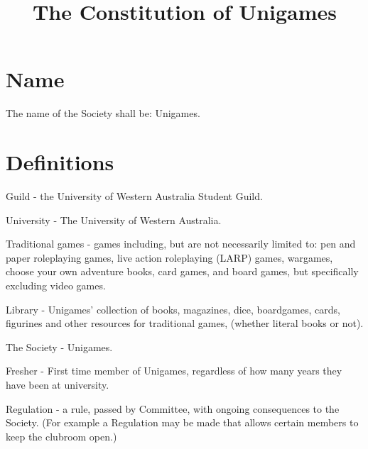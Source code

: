 \documentclass[a4paper]{article}
\title{The Constitution of Unigames}
\author{}
\date{}
\begin{document}
\maketitle


\section{Name} \label{sec:name}
\begin{myEnumerate}
    \item The name of the Society shall be: Unigames.
\end{myEnumerate}


\section{Definitions} \label{sec:definitions}
\begin{myEnumerate}
    \item Guild - the University of Western Australia Student Guild.
    \item University - The University of Western Australia.
    \item Traditional games - games including, but are not necessarily limited to: pen and paper roleplaying games, live action roleplaying (LARP) games, wargames, choose your own adventure books, card games, and board games, but specifically excluding video games.
    \item Library - Unigames' collection of books, magazines, dice, boardgames, cards, figurines and other resources for traditional games, (whether literal books or not).
    \item The Society - Unigames.
    \item Fresher - First time member of Unigames, regardless of how many years they have been at university.
    \item Regulation - a rule, passed by Committee, with ongoing consequences to the Society. (For example a Regulation may be made that allows certain members to keep the clubroom open.)
\end{myEnumerate}
\end{document}

